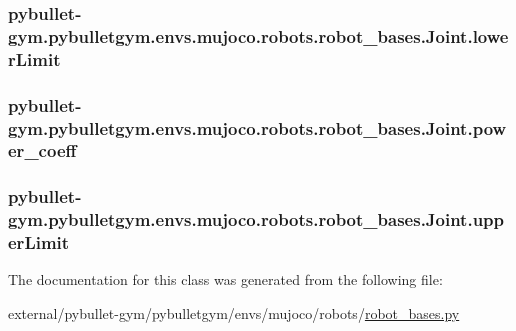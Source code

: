 \subsubsection[{\texorpdfstring{lower\+Limit}{lowerLimit}}]{\setlength{\rightskip}{0pt plus 5cm}pybullet-\/gym.\+pybulletgym.\+envs.\+mujoco.\+robots.\+robot\+\_\+bases.\+Joint.\+lower\+Limit}\hypertarget{classpybullet-gym_1_1pybulletgym_1_1envs_1_1mujoco_1_1robots_1_1robot__bases_1_1_joint_a1dc1b7d9d7341d6aa0a3342f3839fc5b}{}\label{classpybullet-gym_1_1pybulletgym_1_1envs_1_1mujoco_1_1robots_1_1robot__bases_1_1_joint_a1dc1b7d9d7341d6aa0a3342f3839fc5b}
\subsubsection[{\texorpdfstring{power\+\_\+coeff}{power_coeff}}]{\setlength{\rightskip}{0pt plus 5cm}pybullet-\/gym.\+pybulletgym.\+envs.\+mujoco.\+robots.\+robot\+\_\+bases.\+Joint.\+power\+\_\+coeff}\hypertarget{classpybullet-gym_1_1pybulletgym_1_1envs_1_1mujoco_1_1robots_1_1robot__bases_1_1_joint_a3f1ad9acfe6882ec6dccf14f85c847d4}{}\label{classpybullet-gym_1_1pybulletgym_1_1envs_1_1mujoco_1_1robots_1_1robot__bases_1_1_joint_a3f1ad9acfe6882ec6dccf14f85c847d4}
\subsubsection[{\texorpdfstring{upper\+Limit}{upperLimit}}]{\setlength{\rightskip}{0pt plus 5cm}pybullet-\/gym.\+pybulletgym.\+envs.\+mujoco.\+robots.\+robot\+\_\+bases.\+Joint.\+upper\+Limit}\hypertarget{classpybullet-gym_1_1pybulletgym_1_1envs_1_1mujoco_1_1robots_1_1robot__bases_1_1_joint_a9849646cee185459be95dbe4f0722359}{}\label{classpybullet-gym_1_1pybulletgym_1_1envs_1_1mujoco_1_1robots_1_1robot__bases_1_1_joint_a9849646cee185459be95dbe4f0722359}


The documentation for this class was generated from the following file\+:\begin{DoxyCompactItemize}
\item 
external/pybullet-\/gym/pybulletgym/envs/mujoco/robots/\hyperlink{mujoco_2robots_2robot__bases_8py}{robot\+\_\+bases.\+py}\end{DoxyCompactItemize}
